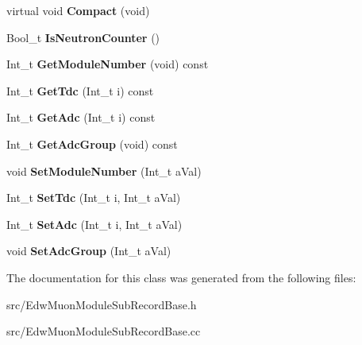 \begin{DoxyCompactItemize}
\item 
\hypertarget{class_edw_muon_module_sub_record_base_a660c56204bf7618ab35f8d81fbd3059a}{
virtual void {\bfseries Compact} (void)}
\label{class_edw_muon_module_sub_record_base_a660c56204bf7618ab35f8d81fbd3059a}

\item 
\hypertarget{class_edw_muon_module_sub_record_base_a9cc5f45f3452e0a29532a8260c1b94b6}{
Bool\_\-t {\bfseries IsNeutronCounter} ()}
\label{class_edw_muon_module_sub_record_base_a9cc5f45f3452e0a29532a8260c1b94b6}

\item 
\hypertarget{class_edw_muon_module_sub_record_base_abd02b3b4de2b2ca8287875461761f340}{
Int\_\-t {\bfseries GetModuleNumber} (void) const }
\label{class_edw_muon_module_sub_record_base_abd02b3b4de2b2ca8287875461761f340}

\item 
\hypertarget{class_edw_muon_module_sub_record_base_a086a3f590fb61016c29cd81ea0862015}{
Int\_\-t {\bfseries GetTdc} (Int\_\-t i) const }
\label{class_edw_muon_module_sub_record_base_a086a3f590fb61016c29cd81ea0862015}

\item 
\hypertarget{class_edw_muon_module_sub_record_base_a5ec55f6ff6e288e428316d548bdc9317}{
Int\_\-t {\bfseries GetAdc} (Int\_\-t i) const }
\label{class_edw_muon_module_sub_record_base_a5ec55f6ff6e288e428316d548bdc9317}

\item 
\hypertarget{class_edw_muon_module_sub_record_base_a71ce9aad5c342abb9e2977e749846ce0}{
Int\_\-t {\bfseries GetAdcGroup} (void) const }
\label{class_edw_muon_module_sub_record_base_a71ce9aad5c342abb9e2977e749846ce0}

\item 
\hypertarget{class_edw_muon_module_sub_record_base_a06f9d8c813f68b5a2b1950908b59716a}{
void {\bfseries SetModuleNumber} (Int\_\-t aVal)}
\label{class_edw_muon_module_sub_record_base_a06f9d8c813f68b5a2b1950908b59716a}

\item 
\hypertarget{class_edw_muon_module_sub_record_base_af9e63f8a4214cc236bec906e407bbf03}{
Int\_\-t {\bfseries SetTdc} (Int\_\-t i, Int\_\-t aVal)}
\label{class_edw_muon_module_sub_record_base_af9e63f8a4214cc236bec906e407bbf03}

\item 
\hypertarget{class_edw_muon_module_sub_record_base_a2d7707d9f09be369fb3a115a2236a66c}{
Int\_\-t {\bfseries SetAdc} (Int\_\-t i, Int\_\-t aVal)}
\label{class_edw_muon_module_sub_record_base_a2d7707d9f09be369fb3a115a2236a66c}

\item 
\hypertarget{class_edw_muon_module_sub_record_base_af932fc7aa501be85a1df8c6a0aff51fe}{
void {\bfseries SetAdcGroup} (Int\_\-t aVal)}
\label{class_edw_muon_module_sub_record_base_af932fc7aa501be85a1df8c6a0aff51fe}

\end{DoxyCompactItemize}


The documentation for this class was generated from the following files:\begin{DoxyCompactItemize}
\item 
src/EdwMuonModuleSubRecordBase.h\item 
src/EdwMuonModuleSubRecordBase.cc\end{DoxyCompactItemize}
